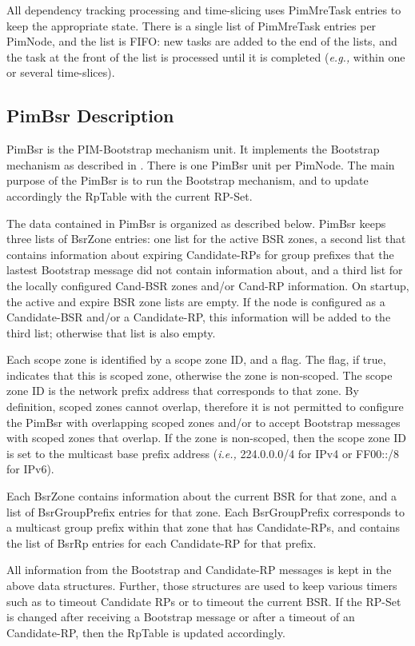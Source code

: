 \documentclass[11pt]{article}
\newcommand{\ie}{\emph{i.e.,}\xspace}
\newcommand{\eg}{\emph{e.g.,}\xspace}
\begin{document}
All dependency tracking processing and time-slicing uses PimMreTask
entries to keep the appropriate state. There is a single list of
PimMreTask entries per PimNode, and the list is FIFO: new tasks are
added to the end of the lists, and the task at the front of the list is
processed until it is completed (\eg within one or several time-slices).

\subsection{PimBsr Description}

PimBsr is the PIM-Bootstrap mechanism unit. It implements the Bootstrap
mechanism as described in \cite{PIM-SM-BOOTSTRAP}. There is one PimBsr
unit per PimNode. The main purpose of the PimBsr is to run the Bootstrap
mechanism, and to update accordingly the RpTable with the current RP-Set.

The data contained in PimBsr is organized as described below.
PimBsr keeps three lists of BsrZone entries: one list for the active BSR
zones, a second list that contains information about expiring Candidate-RPs for
group prefixes that the lastest Bootstrap message did not contain information
about, and a third list for the locally configured Cand-BSR zones and/or
Cand-RP information. On startup, the active and expire BSR zone lists are
empty. If the node is configured as a Candidate-BSR and/or a Candidate-RP,
this information will be added to the third list; otherwise that list is 
also empty.

Each scope zone is identified by a scope zone ID, and a flag.
The flag, if true, indicates that this is scoped zone, otherwise the
zone is non-scoped. The scope zone ID is the network prefix address that
corresponds to that zone. By definition, scoped zones cannot overlap,
therefore it is not permitted to configure the PimBsr with overlapping
scoped zones and/or to accept Bootstrap messages with scoped zones that
overlap. If the zone is non-scoped, then the scope zone ID is set to the
multicast base prefix address (\ie 224.0.0.0/4 for IPv4 or FF00::/8 for
IPv6).

Each BsrZone contains information about the current BSR for that zone,
and a list of BsrGroupPrefix entries for that zone. Each BsrGroupPrefix
corresponds to a multicast group prefix within that zone that has
Candidate-RPs, and contains the list of BsrRp entries for each
Candidate-RP for that prefix.

All information from the Bootstrap and Candidate-RP messages is kept in
the above data structures. Further, those structures are used to keep
various timers such as to timeout Candidate RPs or to timeout the current BSR.
If the RP-Set is changed after receiving a Bootstrap message or after a
timeout of an Candidate-RP, then the RpTable is updated accordingly.
\end{document}
